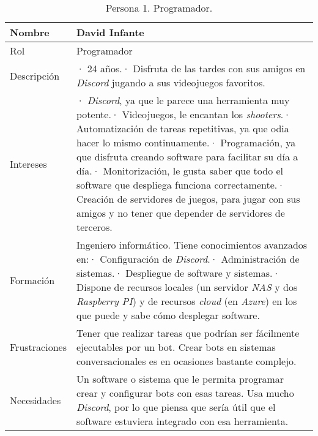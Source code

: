 \begin{table}[H]
    \centering
    \def\arraystretch{1.25}
    \begin{adjustbox}{max width=\textwidth}
    \begin{tabularx}{\textwidth}{|l|L|}
    \hline
        \textbf{Nombre} & \textbf{David Infante} \\ \hline
    \hline
        Rol & Programador \\ \hline
        Descripción & · 24 años.\linebreak · Disfruta de las tardes con sus amigos en \textit{Discord} jugando a sus videojuegos favoritos. \\ \hline
        Intereses & · \textit{Discord}, ya que le parece una herramienta muy potente.\linebreak · Videojuegos, le encantan los \textit{shooters}.\linebreak · Automatización de tareas repetitivas, ya que odia hacer lo mismo continuamente.\linebreak · Programación, ya que disfruta creando software para facilitar su día a día.\linebreak · Monitorización, le gusta saber que todo el software que despliega funciona correctamente.\linebreak · Creación de servidores de juegos, para jugar con sus amigos y no tener que depender de servidores de terceros. \\ \hline
        Formación & Ingeniero informático. Tiene conocimientos avanzados en:\linebreak · Configuración de \textit{Discord}.\linebreak · Administración de sistemas.\linebreak · Despliegue de software y sistemas.\linebreak · Dispone de recursos locales (un servidor \textit{NAS} y dos \textit{Raspberry PI}) y de recursos \textit{cloud} (en \textit{Azure}) en los que puede y sabe cómo desplegar software. \\ \hline
        Frustraciones & Tener que realizar tareas que podrían ser fácilmente ejecutables por un bot. Crear bots en sistemas conversacionales es en ocasiones bastante complejo. \\ \hline
        Necesidades & Un software o sistema que le permita programar crear y configurar bots con esas tareas. Usa mucho \textit{Discord}, por lo que piensa que sería útil que el software estuviera integrado con esa herramienta. \\ \hline
    \end{tabularx}
    \end{adjustbox}
    \caption{Persona 1. Programador.}
\end{table}


